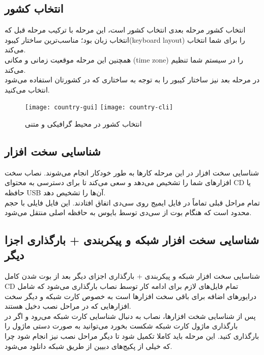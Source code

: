 \subsection{انتخاب کشور}
\begin{frame}{انتخاب کشور}
  مرحله بعدی انتخاب کشور است، این مرحله با ترکیب مرحله قبل که انتخاب زبان بود؛ مناسب‌ترین ساختار کیبود(keyboard layout) را برای شما انتخاب می‌کند.\\
  همچنین این مرحله موقعیت زمانی و مکانی (time zone) را در سیستم شما تنظیم می‌کند.\\
  در مرحله بعد نیز ساختار کیبور را به توجه به ساختاری که در کشورتان استفاده می‌شود انتخاب می‌کنید.
  \begin{figure}
    \texttt{[image: country-gui]}
    \texttt{[image: country-cli]}
    \caption{انتخاب کشور در محیط گرافیکی و متنی~\cite{fig:deb_country_gui}}
  \end{figure}
\end{frame}

\subsection{شناسایی سخت افزار}
\begin{frame}{شناسایی سخت افزار}
  در این مرحله کارها به طور خودکار انجام می‌شوند. نصاب سخت افزارهای شما را تشخیص می‌دهد و سعی می‌کند تا برای دسترسی به محتوای CD یا حافظه USB آن‌ها را تشخیص دهد.\\
تمام مراحل قبلی تماماً در فایل ایمیج روی سی‌دی اتفاق افتادند. این فایل فایلی با حجم محدود است که هنگام بوت از سی‌دی توسط بایوس به حافظه اصلی منتقل می‌شود.
\end{frame}

\subsection{شناسایی سخت افزار شبکه و پیکربندی + بارگذاری اجزا دیگر}
\begin{frame}{شناسایی سخت افزار شبکه و پیکربندی + بارگذاری اجزای دیگر}
  بعد از بوت شدن کامل CD تمام فایل‌های لازم برای ادامه کار توسط نصاب بارگذاری می‌شود که شامل درایورهای اضافه برای باقی سخت افزارها است به خصوص کارت شبکه و دیگر سخت افزارهایی که در مراحل نصب دخیل هستند.\\
  پس از شناسایی شخت افزارها، نصاب به دنبال شناسایی کارت شبکه می‌رود و اگر در بارگذاری ماژول کارت شبکه شکست بخورد می‌توانید به صورت دستی ماژول را بارگذاری کنید.
  این مرحله باید کاملا تکمیل شود تا دیگر مراحل نصب نیز انجام شود چرا که خیلی از پکیج‌های دبیین از طریق شبکه دانلود می‌شود.
\end{frame}

